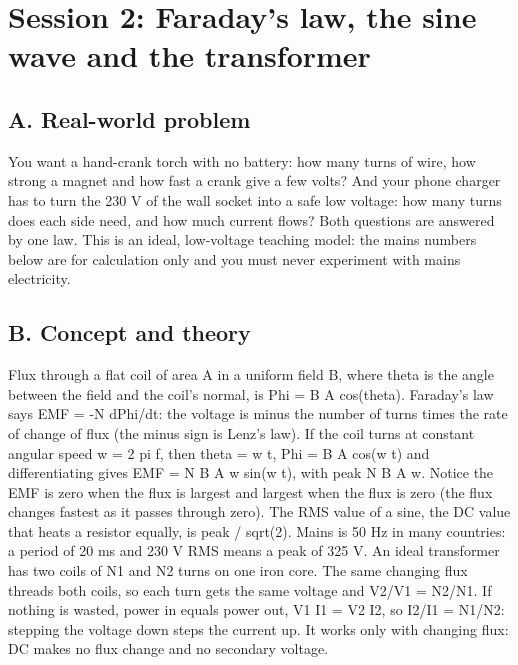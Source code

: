 \documentclass[11pt,a4paper]{article}
\begin{document}
\section{Session 2: Faraday's law, the sine wave and the transformer}

\subsection*{A. Real-world problem}
You want a hand-crank torch with no battery: how many turns of wire, how strong a magnet and how fast a crank give a few volts? And your phone charger has to turn the 230 V of the wall socket into a safe low voltage: how many turns does each side need, and how much current flows? Both questions are answered by one law. This is an ideal, low-voltage teaching model: the mains numbers below are for calculation only and you must never experiment with mains electricity.

\subsection*{B. Concept and theory}
Flux through a flat coil of area A in a uniform field B, where theta is the angle between the field and the coil's normal, is Phi = B A cos(theta). Faraday's law says EMF = -N dPhi/dt: the voltage is minus the number of turns times the rate of change of flux (the minus sign is Lenz's law). If the coil turns at constant angular speed w = 2 pi f, then theta = w t, Phi = B A cos(w t) and differentiating gives EMF = N B A w sin(w t), with peak N B A w. Notice the EMF is zero when the flux is largest and largest when the flux is zero (the flux changes fastest as it passes through zero). The RMS value of a sine, the DC value that heats a resistor equally, is peak / sqrt(2). Mains is 50 Hz in many countries: a period of 20 ms and 230 V RMS means a peak of 325 V. An ideal transformer has two coils of N1 and N2 turns on one iron core. The same changing flux threads both coils, so each turn gets the same voltage and V2/V1 = N2/N1. If nothing is wasted, power in equals power out, V1 I1 = V2 I2, so I2/I1 = N1/N2: stepping the voltage down steps the current up. It works only with changing flux: DC makes no flux change and no secondary voltage.
\end{document}
